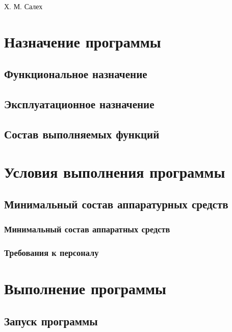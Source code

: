 \documentclass[a4paper,12pt]{article}
\begin{document}
	
	
	

	{Х. М. Салех}
	
	\firstPage
						\newpage
	\secondPage
						\newpage
	\thirdPage
						\newpage
	\section{Назначение программы}
	\subsection{Функциональное назначение }
	\subsection{Эксплуатационное назначение}
	\subsection{Состав выполняемых функций}
	
					\newpage
	\section{Условия выполнения программы}
	\subsection{Минимальный состав аппаратурных средств
	}
	\subsubsection{Минимальный состав аппаратных средств}
	\subsubsection{Требования к персоналу}
	
					\newpage 
	\section{Выполнение программы}
	\subsection{Запуск программы}
\end{document}
